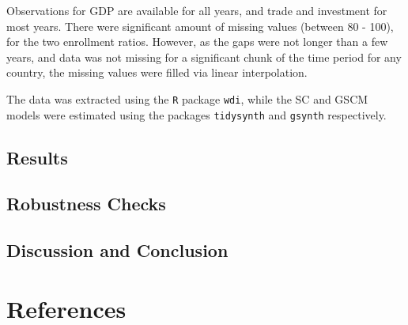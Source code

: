 \documentclass[12pt,nobind, a4paper]{reedthesis}
\begin{document}
 Observations for GDP are available for all years, and trade and investment for most years. There were significant amount of missing values (between 80 - 100), for the two enrollment ratios. However, as the gaps were not longer than a few years, and data was not missing for a significant chunk of the time period for any country, the missing values were filled via linear interpolation.
 \linebreak

 The data was extracted using the \texttt{R} package \texttt{wdi}, while the SC and GSCM models were estimated using the packages \texttt{tidysynth} and \texttt{gsynth} respectively.

 \hypertarget{results}{%
 \section{Results}\label{results}}

 \hypertarget{robustness-checks}{%
 \section{Robustness Checks}\label{robustness-checks}}

 \hypertarget{discussion-and-conclusion}{%
 \section{Discussion and Conclusion}\label{discussion-and-conclusion}}

 \backmatter

 \hypertarget{references}{%
 \chapter*{References}\label{references}}


 \noindent

 \setlength{\parindent}{-0.20in}
\end{document}
